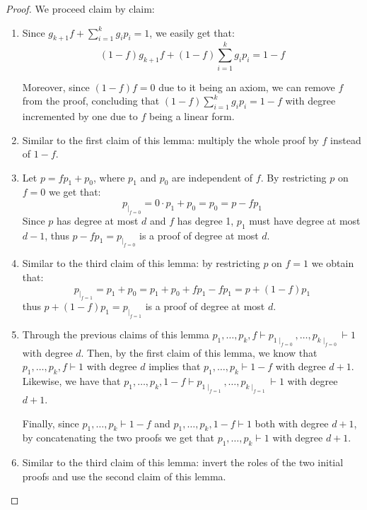 \begin{proof}
    We proceed claim by claim:
    \begin{enumerate}
        \item Since $g_{k+1}f + \sum_{i = 1}^k g_i p_i = 1$, we easily get that:
        \[(1-f)g_{k+1}f + (1-f)\sum_{i = 1}^k g_i p_i = 1-f\]
        
        Moreover, since $(1-f) f = 0$ due to it being an axiom, we can remove $f$ from the proof, concluding that $(1-f)\sum_{i = 1}^k g_i p_i = 1-f$ with degree incremented by one due to  $f$ being a linear form.
    
        \item Similar to the first claim of this lemma: multiply the whole proof by $f$ instead of $1-f$.
        
        \item Let $p = f p_1 + p_0$, where $p_1$ and $p_0$ are independent of $f$. By restricting $p$ on $f = 0$ we get that:
        \[p_{\mid_{f=0}} = 0 \cdot p_1 + p_0 = p_0 = p - f p_1\]
        Since $p$ has degree at most $d$ and $f$ has degree 1, $p_1$ must have degree at most $d-1$, thus $p - f p_1 = p_{\mid_{f=0}}$ is a proof of degree at most $d$.
        
        \item Similar to the third claim of this lemma: by restricting $p$ on $f=1$ we obtain that:
        \[p_{\mid_{f=1}} = p_1 + p_0 = p_1 + p_0 + fp_1 - fp_1 = p+(1-f)p_1\]
        thus $p + (1-f)p_1 = p_{\mid_{f=1}}$ is a proof of degree at most $d$.

        \item Through the previous claims of this lemma $p_1, \ldots, p_k, f \vdash p_{1\mid_{f=0}}, \ldots, p_{k\mid_{f=0}} \vdash 1$ with degree $d$. Then, by the first claim of this lemma, we know that $p_1, \ldots, p_k, f \vdash  1$ with degree $d$ implies that $p_1, \ldots, p_k \vdash 1-f$ with degree $d+1$. Likewise, we have that $p_1, \ldots, p_k, 1-f \vdash p_{1\mid_{f=1}}, \ldots, p_{k\mid_{f=1}} \vdash 1$ with degree $d+1$.
        
        Finally, since $p_1, \ldots, p_k \vdash 1-f$ and $p_1, \ldots, p_k, 1-f \vdash 1$ both with degree $d+1$, by concatenating the two proofs we get that $p_1, \ldots, p_k \vdash 1$ with degree $d+1$.

        \item Similar to the third claim of this lemma: invert the roles of the two initial proofs and use the second claim of this lemma.
    \end{enumerate}
\end{proof}

